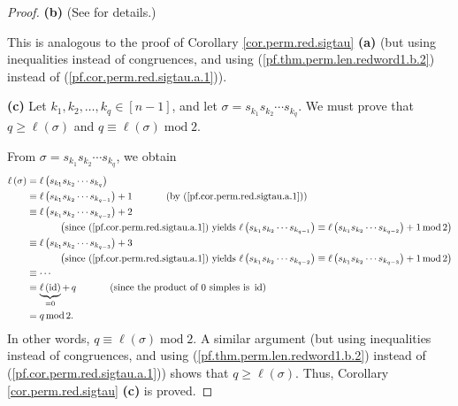 \begin{proof}
\textbf{(b)} (See \cite[Exercise 5.2 \textbf{(c)}]{detnotes} for details.)

This is analogous to the proof of Corollary \ref{cor.perm.red.sigtau}
\textbf{(a)} (but using inequalities instead of congruences, and using
(\ref{pf.thm.perm.len.redword1.b.2}) instead of
(\ref{pf.cor.perm.red.sigtau.a.1})). \medskip

\textbf{(c)} Let $k_{1},k_{2},\ldots,k_{q}\in\left[  n-1\right]  $, and let
$\sigma=s_{k_{1}}s_{k_{2}}\cdots s_{k_{q}}$. We must prove that $q\geq
\ell\left(  \sigma\right)  $ and $q\equiv\ell\left(  \sigma\right)
\operatorname{mod}2$.

From $\sigma=s_{k_{1}}s_{k_{2}}\cdots s_{k_{q}}$, we obtain%
\begin{align*}
\ell\left(  \sigma\right)   &  =\ell\left(  s_{k_{1}}s_{k_{2}}\cdots s_{k_{q}%
}\right) \\
&  \equiv\ell\left(  s_{k_{1}}s_{k_{2}}\cdots s_{k_{q-1}}\right)
+1\ \ \ \ \ \ \ \ \ \ \left(  \text{by (\ref{pf.cor.perm.red.sigtau.a.1}%
)}\right) \\
&  \equiv\ell\left(  s_{k_{1}}s_{k_{2}}\cdots s_{k_{q-2}}\right)  +2\\
&  \ \ \ \ \ \ \ \ \ \ \left(  \text{since (\ref{pf.cor.perm.red.sigtau.a.1})
yields }\ell\left(  s_{k_{1}}s_{k_{2}}\cdots s_{k_{q-1}}\right)  \equiv
\ell\left(  s_{k_{1}}s_{k_{2}}\cdots s_{k_{q-2}}\right)  +1\operatorname{mod}%
2\right) \\
&  \equiv\ell\left(  s_{k_{1}}s_{k_{2}}\cdots s_{k_{q-3}}\right)  +3\\
&  \ \ \ \ \ \ \ \ \ \ \left(  \text{since (\ref{pf.cor.perm.red.sigtau.a.1})
yields }\ell\left(  s_{k_{1}}s_{k_{2}}\cdots s_{k_{q-2}}\right)  \equiv
\ell\left(  s_{k_{1}}s_{k_{2}}\cdots s_{k_{q-3}}\right)  +1\operatorname{mod}%
2\right) \\
&  \equiv\cdots\\
&  \equiv\underbrace{\ell\left(  \operatorname*{id}\right)  }_{=0}%
+\,q\ \ \ \ \ \ \ \ \ \ \left(  \text{since the product of }0\text{ simples is
}\operatorname*{id}\right) \\
&  =q\operatorname{mod}2.
\end{align*}
In other words, $q\equiv\ell\left(  \sigma\right)  \operatorname{mod}2$. A
similar argument (but using inequalities instead of congruences, and using
(\ref{pf.thm.perm.len.redword1.b.2}) instead of
(\ref{pf.cor.perm.red.sigtau.a.1})) shows that $q\geq\ell\left(
\sigma\right)  $. Thus, Corollary \ref{cor.perm.red.sigtau} \textbf{(c)} is proved.
\end{proof}

